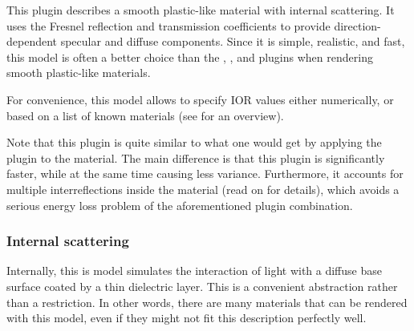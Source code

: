 
\vspace{3mm}
This plugin describes a smooth plastic-like material with internal scattering.
It uses the Fresnel reflection and transmission coefficients to provide
direction-dependent specular and diffuse components.
Since it is simple, realistic, and fast, this model is often a better choice
than the , , and 
plugins when rendering smooth plastic-like materials.

For convenience, this model allows to specify IOR values either numerically,
or based on a list of known materials (see  for
an overview).

Note that this plugin is quite similar to what one would get by applying the
 plugin to the  material. The main
difference is that this plugin is significantly faster, while at the same
time causing less variance. Furthermore, it accounts for multiple
interreflections inside the material (read on for details), which avoids
a serious energy loss problem of the aforementioned plugin
combination.
\newpage



\subsubsection*{Internal scattering}
Internally, this is model simulates the interaction of light with a diffuse
base surface coated by a thin dielectric layer. This is a convenient
abstraction rather than a restriction. In other words, there are many
materials that can be rendered with this model, even if they might not
fit this description perfectly well.

